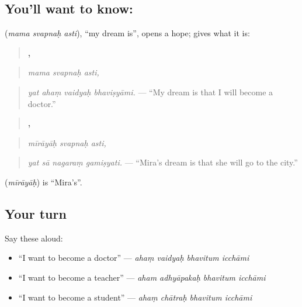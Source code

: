 \subsection*{You'll want to know:   }
\textbf{  } (\emph{mama svapnaḥ asti}), \textquotedblleft{}my dream is\textquotedblright{}, opens a hope; \textbf{} gives what it is:

\begin{quote}
\textbf{  ,}
\end{quote}

\begin{quote}
\emph{mama svapnaḥ asti,}
\end{quote}

\begin{quote}
\textbf{   }
\end{quote}

\begin{quote}
\emph{yat ahaṃ vaidyaḥ bhaviṣyāmi.} — \textquotedblleft{}My dream is that I will become a doctor.\textquotedblright{}
\end{quote}

\begin{quote}
\textbf{  ,}
\end{quote}

\begin{quote}
\emph{mīrāyāḥ svapnaḥ asti,}
\end{quote}

\begin{quote}
\textbf{   }
\end{quote}

\begin{quote}
\emph{yat sā nagaraṃ gamiṣyati.} — \textquotedblleft{}Mira's dream is that she will go to the city.\textquotedblright{}
\end{quote}

\textbf{} (\emph{mīrāyāḥ}) is \textquotedblleft{}Mira's\textquotedblright{}.

\subsection*{Your turn}
Say these aloud:

\begin{itemize}
\raggedright
  \item \textquotedblleft{}I want to become a doctor\textquotedblright{} — \emph{ahaṃ vaidyaḥ bhavitum icchāmi}
  \item \textquotedblleft{}I want to become a teacher\textquotedblright{} — \emph{aham adhyāpakaḥ bhavitum icchāmi}
  \item \textquotedblleft{}I want to become a student\textquotedblright{} — \emph{ahaṃ chātraḥ bhavitum icchāmi}
\end{itemize}


